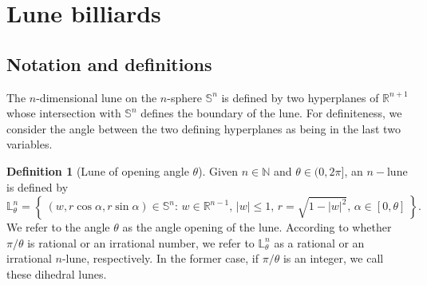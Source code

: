 \documentclass[11pt,a4paper,times]{amsart}
\theoremstyle{plain}
\theoremstyle{definition}
\newtheorem{definition}[thm]{Definition}%
\numberwithin{equation}{section}
\newcommand{\R}{\mathbb{R}}
\newcommand{\N}{\mathbb{N}}
\newcommand{\Se}{\mathbb{S}}
\newcommand{\lune}[2]{\mathbb{L}^{#1}_{#2}}
\newcommand{\txtg}{\textcolor{green}}
\begin{document}
\section{Lune billiards}
\subsection{Notation and definitions}\label{lunedefinition}
 The $n$-dimensional lune on the $n$-sphere $\Se^n$ is defined by two
 hyperplanes of $\mathbb{R}^{n+1}$ whose intersection with $\Se^n$ defines the boundary of the lune.  For
 definiteness, we consider the angle between the two  {defining hyperplanes} as being in the last two
 variables.
 \begin{definition}[Lune of opening angle $\theta$]\label{lunedef}
 Given $n\in\N$ and $\theta\in (0,2\pi]$, an $n-$lune is defined by
  \begin{equation}
 \lune{n}{\theta} = \left\{~(w,r\cos\alpha, r\sin\alpha)\in \Se^n:\, w\in \R^{n-1},\, |w|\leq 1,\,
  r=\sqrt{1-|w|^2},\, 
   \alpha\in [0,\theta]~\right\}. \label{lune}
  \end{equation}
%
 We refer to the angle $\theta$ as the angle opening of the lune. According to whether $\pi/\theta$ is
 rational or an irrational number, we refer to $\lune{n}{\theta}$ as a rational or an irrational $n$-lune,
 respectively. In the former case, if $\pi/\theta$ is an integer, we call these dihedral lunes.
  \end{definition}
\end{document}
